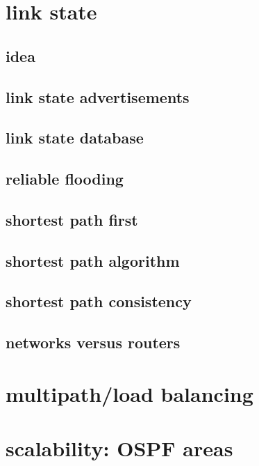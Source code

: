 \section{link state}
\subsection{idea}

\subsection{link state advertisements}

\subsection{link state database}

\subsection{reliable flooding}


\subsection{shortest path first}


\subsection{shortest path algorithm}


\subsection{shortest path consistency}


\subsection{networks versus routers}
 

\section{multipath/load balancing}


\section{scalability: OSPF areas} %

